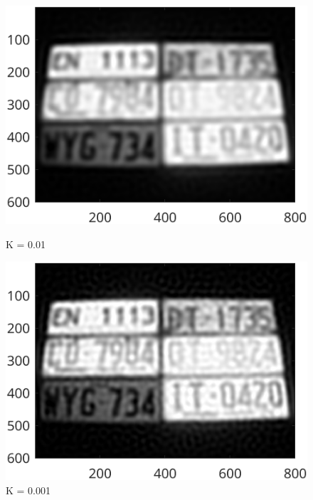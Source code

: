 \documentclass{article}
\begin{document}
	\begin{figure}[ht]
  	\centering
  	\begin{minipage}[t]{0.45\textwidth}
    	\centering
    	\includegraphics[width=\textwidth]{2AE3_D01}
    	\caption{K = 0.01}
    	\label{fig:2AE3_D01}
  	\end{minipage}\hfill
  	\begin{minipage}[t]{0.45\textwidth}
    	\centering
    	\includegraphics[width=\textwidth]{2AE3_D001}
    	\caption{K = 0.001}
    	\label{fig:2AE3_D001}
  	\end{minipage}
	\end{figure}
\end{document}
